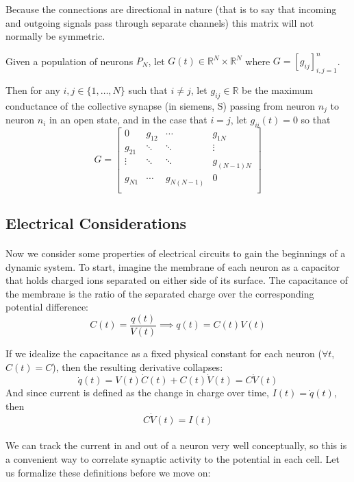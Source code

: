 \documentclass{article}
\begin{document}
Because the connections are directional in nature (that is to say that incoming and outgoing signals pass through separate channels) this matrix will not normally be symmetric.

\begin{definition}[$G = \textbf{synapse maximum conductance matrix}$]\label{G}
Given a population of neurons $P_{N}$, let $G(t) \in \mathbb{R}^{N} \times \mathbb{R}^{N}$ where $G = [g_{ij}]_{i,j=1}^{n}$.

Then for any $i,j \in \{ 1, \dots, N \}$ such that $i \ne j$, let $g_{ij}\in \mathbb{R}$ be the maximum conductance of the collective synapse (in siemens, S) passing from neuron $n_{j}$ to neuron $n_{i}$ in an open state, and in the case that $i=j$, let $g_{ii}(t) = 0$ so that
\[ G =
\begin{bmatrix}
0	&	g_{12}	& \cdots & g_{1N} \\
g_{21}	& \ddots & \ddots & \vdots \\
\vdots	& \ddots & \ddots & g_{(N-1)N} \\
g_{N1}	& \cdots & g_{N(N-1)} & 0 \\
\end{bmatrix}\]
\end{definition}

\subsection{Electrical Considerations}

\paragraph{}
Now we consider some properties of electrical circuits to gain the beginnings of a dynamic system. To start, imagine the membrane of each neuron as a capacitor that holds charged ions separated on either side of its surface. The capacitance of the membrane is the ratio of the separated charge over the corresponding potential difference:
\[ C(t) = \frac{q(t)}{V(t)} \implies q(t) = C(t)V(t) \]

If we idealize the capacitance as a fixed physical constant for each neuron ($\forall t$, $C(t)=C$), then the resulting derivative collapses:
\[ \dot{q}(t) = V(t)\dot{C}(t) + C(t)\dot{V}(t) = C\dot{V}(t) \]
And since current is defined as the change in charge over time, $I(t) = \dot{q}(t)$, then
\[ C\dot{V}(t) = I(t) \]

\paragraph{}
We can track the current in and out of a neuron very well conceptually, so this is a convenient way to correlate synaptic activity to the potential in each cell. Let us formalize these definitions before we move on:
\end{document}
